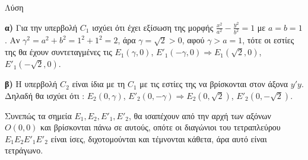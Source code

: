 \noindent Λύση

\noindent \textbf{α)} Για την υπερβολή $C_1$ ισχύει ότι έχει εξίσωση της μορφής $\frac{x^2}{a^2} - \frac{y^2}{b^2}=1$ με $a=b=1$.
Αν $\gamma^2 = a^2 + b^2 = 1^2+1^2=2$, άρα $\gamma=\sqrt{2}>0$, αφού $\gamma>a=1$,
τότε οι εστίες της θα έχουν συντεταγμένες τις $E_1(\gamma,0)$, $E'_1(-\gamma,0) \Rightarrow E_1(\sqrt{2},0)$, $E'_1(-\sqrt{2},0)$.

\noindent \textbf{β)} Η υπερβολή $C_2$ είναι ίδια με τη $C_1$ με τις εστίες της να βρίσκονται στον άξονα $y'y$.
Δηλαδή θα ισχύει ότι : $E_2(0,\gamma)$, $E'_2(0,-\gamma) \Rightarrow E_2(0,\sqrt{2})$, $E'_2(0,-\sqrt{2})$.

\noindent Συνεπώς τα σημεία $E_1, E_2, E'_1, E'_2$, θα ισαπέχουν από την αρχή των αξόνων $O(0,0)$ και βρίσκονται πάνω σε αυτούς, οπότε οι διαγώνιοι του τετραπλεύρου $E_1 E_2 E'_1 E'_2$ είναι ίσες, διχοτομούνται και τέμνονται κάθετα, άρα αυτό είναι τετράγωνο.

\endlysh